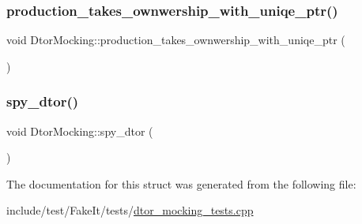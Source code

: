 \subsubsection{\texorpdfstring{production\_takes\_ownwership\_with\_uniqe\_ptr()}{production\_takes\_ownwership\_with\_uniqe\_ptr()}}
{\footnotesize\ttfamily void Dtor\+Mocking\+::production\+\_\+takes\+\_\+ownwership\+\_\+with\+\_\+uniqe\+\_\+ptr (\begin{DoxyParamCaption}{ }\end{DoxyParamCaption})\hspace{0.3cm}{\ttfamily [inline]}}

\mbox{\label{structDtorMocking_a6ae562cd8a019e7385310a462ae4acc3}} 
\subsubsection{\texorpdfstring{spy\_dtor()}{spy\_dtor()}}
{\footnotesize\ttfamily void Dtor\+Mocking\+::spy\+\_\+dtor (\begin{DoxyParamCaption}{ }\end{DoxyParamCaption})\hspace{0.3cm}{\ttfamily [inline]}}



The documentation for this struct was generated from the following file\+:\begin{DoxyCompactItemize}
\item 
include/test/\+Fake\+It/tests/\mbox{\hyperlink{dtor__mocking__tests_8cpp}{dtor\+\_\+mocking\+\_\+tests.\+cpp}}\end{DoxyCompactItemize}
